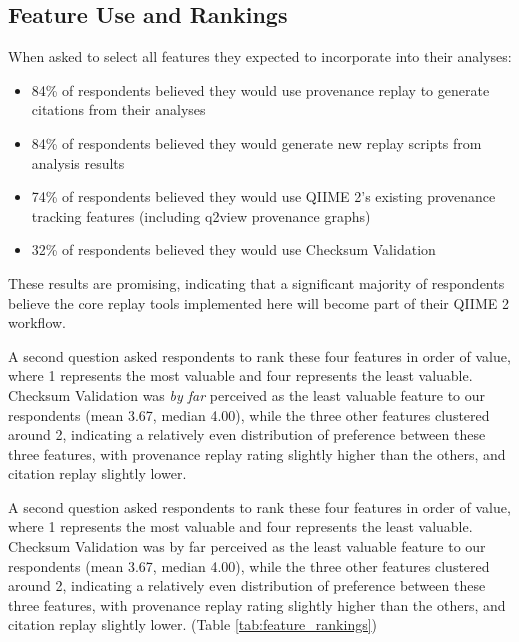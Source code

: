 \subsection{Feature Use and Rankings}

When asked to select all features they expected to incorporate into their
analyses:

\begin{itemize}
    \item 84\% of respondents believed they would use provenance replay to generate citations from their analyses
    \item 84\% of respondents believed they would generate new replay scripts from analysis results
    \item 74\% of respondents believed they would use QIIME 2’s existing provenance tracking features (including q2view provenance graphs)
    \item 32\% of respondents believed they would use Checksum Validation
\end{itemize}

These results are promising, indicating that a significant majority of
respondents believe the core replay tools implemented here will become part of
their QIIME 2 workflow.

A second question asked respondents to rank these four features in order of
value, where 1 represents the most valuable and four represents the least
valuable. Checksum Validation was \textit{by far} perceived as the least valuable feature
to our respondents (mean 3.67, median 4.00), while the three other features
clustered around 2, indicating a relatively even distribution of preference
between these three features, with provenance replay rating slightly higher than
the others, and citation replay slightly lower.

A second question asked respondents to rank these four features in order of
value, where 1 represents the most valuable and four represents the least
valuable. Checksum Validation was by far perceived as the least valuable feature
to our respondents (mean 3.67, median 4.00), while the three other features
clustered around 2, indicating a relatively even distribution of preference
between these three features, with provenance replay rating slightly higher than
the others, and citation replay slightly lower. (Table \ref{tab:feature_rankings})

